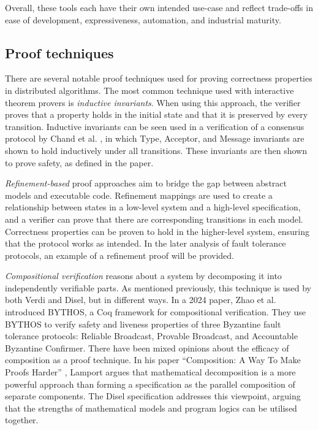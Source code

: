 \documentclass[acmsmall,screen,review]{acmart}
\begin{document}
    Overall, these tools each have their own intended use-case and reflect trade-offs in ease of development, expressiveness, automation, and industrial maturity.

  \subsection{Proof techniques}
    There are several notable proof techniques used for proving correctness properties in distributed algorithms.
    The most common technique used with interactive theorem provers is \emph{inductive invariants}.
    When using this approach, the verifier proves that a property holds in the initial state and that it is preserved by every transition.
    Inductive invariants can be seen used in a verification of a consensus protocol by Chand et al. \cite{chandFormalVerificationMultiPaxos2016}, in which Type, Acceptor, and Message invariants are shown to hold inductively under all transitions.
    These invariants are then shown to prove safety, as defined in the paper.

    \emph{Refinement-based} proof approaches aim to bridge the gap between abstract models and executable code.
    Refinement mappings \cite{abadiExistenceRefinementMappings1991} are used to create a relationship between states in a low-level system and a high-level specification, 
    and a verifier can prove that there are corresponding transitions in each model.
    Correctness properties can be proven to hold in the higher-level system, ensuring that the protocol works as intended.
    In the later analysis of fault tolerance protocols, an example of a refinement proof will be provided.

    \emph{Compositional verification} reasons about a system by decomposing it into independently verifiable parts.
    As mentioned previously, this technique is used by both Verdi and Disel, but in different ways.
    In a 2024 paper, Zhao et al. \cite{zhaoCompositionalVerificationComposite2024} introduced BYTHOS, a Coq framework for compositional verification.
    They use BYTHOS to verify safety and liveness properties of three Byzantine fault tolerance protocols: Reliable Broadcast, Provable Broadcast, and Accountable Byzantine Confirmer.
    There have been mixed opinions about the efficacy of composition as a proof technique.
    In his paper ``Composition: A Way To Make Proofs Harder'' \cite{lamportCompositionWayMake1998b}, 
    Lamport argues that mathematical decomposition is a more powerful approach than forming a specification as the parallel composition of separate components.
    The Disel specification \cite{sergeyProgrammingProvingDistributed2017} addresses this viewpoint,
    arguing that the strengths of mathematical models and program logics can be utilised together.
\end{document}
